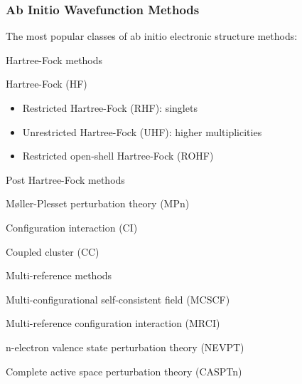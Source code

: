 \documentclass[slidestop,mathserif,compress,xcolor=svgnames]{beamer}
\begin{document}
\begin{frame}
  \frametitle{\small Ab Initio Wavefunction Methods}
  \begin{block}{\small The most popular classes of ab initio electronic structure methods:}
    \begin{itemize}
      \item Hartree-Fock methods
      \begin{itemize}
	\footnotesize{
	\item[$\vardiamond$] Hartree-Fock (HF)
	\begin{itemize}
	  \item[$\blacksquare$] Restricted Hartree-Fock (RHF): singlets
	  \item[$\blacksquare$] Unrestricted Hartree-Fock (UHF): higher multiplicities
	  \item[$\blacksquare$] Restricted open-shell Hartree-Fock (ROHF)
	\end{itemize}
	}
      \end{itemize}
      \item Post Hartree-Fock methods
      \begin{itemize}
	\footnotesize{
	\item[$\vardiamond$] M{\o}ller-Plesset perturbation theory (MPn)
	\item[$\vardiamond$] Configuration interaction (CI)
	\item[$\vardiamond$] Coupled cluster (CC)
	}
      \end{itemize}
      \item Multi-reference methods
      \begin{itemize}
	\footnotesize{
	\item[$\vardiamond$] Multi-configurational self-consistent field (MCSCF)
	\item[$\vardiamond$] Multi-reference configuration interaction (MRCI)
	\item[$\vardiamond$] n-electron valence state perturbation theory (NEVPT)
	\item[$\vardiamond$] Complete active space perturbation theory (CASPTn)
	}
      \end{itemize}
    \end{itemize}
  \end{block}
\end{frame}
\end{document}
